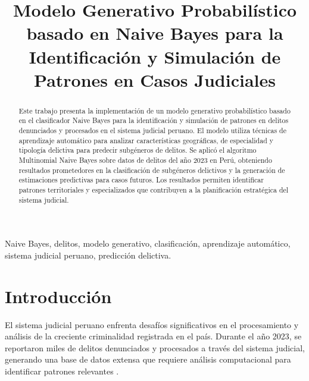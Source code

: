 \documentclass[conference]{IEEEtran}
\begin{document}
\title{Modelo Generativo Probabilístico basado en Naive Bayes para la Identificación y Simulación de Patrones en Casos Judiciales}

\author{
\and
{}
}

\maketitle

\begin{abstract}
Este trabajo presenta la implementación de un modelo generativo probabilístico basado en el clasificador Naive Bayes para la identificación y simulación de patrones en delitos denunciados y procesados en el sistema judicial peruano. El modelo utiliza técnicas de aprendizaje automático para analizar características geográficas, de especialidad y tipología delictiva para predecir subgéneros de delitos. Se aplicó el algoritmo Multinomial Naive Bayes sobre datos de delitos del año 2023 en Perú, obteniendo resultados prometedores en la clasificación de subgéneros delictivos y la generación de estimaciones predictivas para casos futuros. Los resultados permiten identificar patrones territoriales y especializados que contribuyen a la planificación estratégica del sistema judicial.
\end{abstract}

\begin{IEEEkeywords}
Naive Bayes, delitos, modelo generativo, clasificación, aprendizaje automático, sistema judicial peruano, predicción delictiva.
\end{IEEEkeywords}

\section{Introducción}

El sistema judicial peruano enfrenta desafíos significativos en el procesamiento y análisis de la creciente criminalidad registrada en el país. Durante el año 2023, se reportaron miles de delitos denunciados y procesados a través del sistema judicial, generando una base de datos extensa que requiere análisis computacional para identificar patrones relevantes \cite{ref1}.
\end{document}
